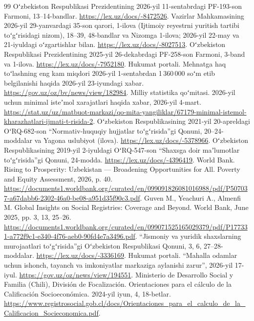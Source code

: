 \documentclass[12pt,a4paper]{extarticle}
\begin{document}
\renewcommand{\refname}{Manbalar}
\begingroup\fontsize{12bp}{14.4bp}\selectfont
\begin{thebibliography}{99}
 Oʻzbekiston Respublikasi Prezidentining 2026-yil 11-sentabrdagi PF-193-son Farmoni, 13–14-bandlar. \url{https://lex.uz/docs/-8472526}.
 Vazirlar Mahkamasining 2026-yil 29-yanvardagi 35-son qarori, 1-ilova (Ijtimoiy reyestrni yuritish tartibi toʻgʻrisidagi nizom), 18–39, 48-bandlar va Nizomga 1-ilova; 2026-yil 22-may va 21-iyuldagi oʻzgartishlar bilan. \url{https://lex.uz/docs/-8027513}.
 Oʻzbekiston Respublikasi Prezidentining 2025-yil 26-dekabrdagi PF-258-son Farmoni, 3-band va 1-ilova. \url{https://lex.uz/docs/-7952180}.
 Hukumat portali. Mehnatga haq toʻlashning eng kam miqdori 2026-yil 1-sentabrdan 1\,360\,000 soʻm etib belgilanishi haqida 2026-yil 23-iyundagi xabar. \url{https://gov.uz/oz/bv/news/view/182984}.
 Milliy statistika qoʻmitasi. 2026-yil uchun minimal isteʼmol xarajatlari haqida xabar, 2026-yil 4-mart. \url{https://stat.uz/uz/matbuot-markazi/qo-mita-yangiliklar/67179-minimal-istemol-kharazhatlari-ijmati-t-risida-2}.
 Oʻzbekiston Respublikasining 2021-yil 20-apreldagi OʻRQ-682-son “Normativ-huquqiy hujjatlar toʻgʻrisida”gi Qonuni, 20–24-moddalar va Yagona uslubiyot (ilova). \url{https://lex.uz/docs/-5378966}.
 Oʻzbekiston Respublikasining 2019-yil 2-iyuldagi OʻRQ-547-son “Shaxsga doir maʼlumotlar toʻgʻrisida”gi Qonuni, 24-modda. \url{https://lex.uz/docs/-4396419}.
 World Bank. Rising to Prosperity: Uzbekistan — Broadening Opportunities for All. Poverty and Equity Assessment, 2026, p. 40. \url{https://documents1.worldbank.org/curated/en/099091826081016988/pdf/P507037-a67dabb6-2302-46a0-be08-a951d35f90c3.pdf}.
 Guven M., Yeachuri A., Almenfi M. Global Insights on Social Registries: Coverage and Beyond. World Bank, June 2025, pp. 3, 13, 25–26. \url{https://documents1.worldbank.org/curated/en/099071525165029379/pdf/P177331-a772f9c1-e340-4f76-aeb0-90fd4e7a3496.pdf}.
 “Jismoniy va yuridik shaxslarning murojaatlari toʻgʻrisida”gi Oʻzbekiston Respublikasi Qonuni, 3, 6, 27–28-moddalar. \url{https://lex.uz/docs/-3336169}.
 Hukumat portali. “Mahalla odamlar uchun ishonch, tayanch va imkoniyatlar markaziga aylanishi zarur”, 2026-yil 17-iyul. \url{https://gov.uz/oz/news/view/194551}.
 Ministerio de Desarrollo Social y Familia (Chili), División de Focalización. Orientaciones para el cálculo de la Calificación Socioeconómica. 2024-yil iyun, 4, 18-betlar. \url{https://www.registrosocial.gob.cl/docs/Orientaciones_para_el_calculo_de_la_Calificacion_Socieconomica.pdf}.
\end{thebibliography}\endgroup
\end{document}
